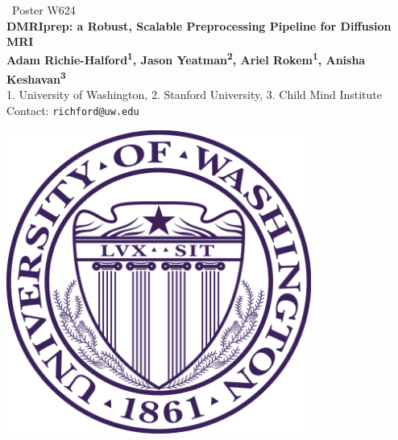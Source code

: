 \documentclass[a0, landscape]{a0poster}
\begin{document}


\begin{minipage}[b]{0.88\linewidth}
\Large ~Poster W624\\

\veryHuge \color{NavyBlue} \textbf{DMRIprep: a Robust, Scalable Preprocessing Pipeline for Diffusion MRI} \color{Black}\\ %
\huge \textbf{Adam Richie-Halford\textsuperscript{1}, Jason Yeatman\textsuperscript{2}, Ariel Rokem\textsuperscript{1}, Anisha Keshavan\textsuperscript{3}}\\ %
\Large 1. University of Washington, 2. Stanford University, 3. Child Mind Institute \\ %
\Large Contact: \texttt{richford@uw.edu}
\end{minipage}
%
%
\begin{minipage}[b]{0.19\linewidth}
\includegraphics[width=10cm]{UWlogo.png}
\end{minipage}
\end{document}
